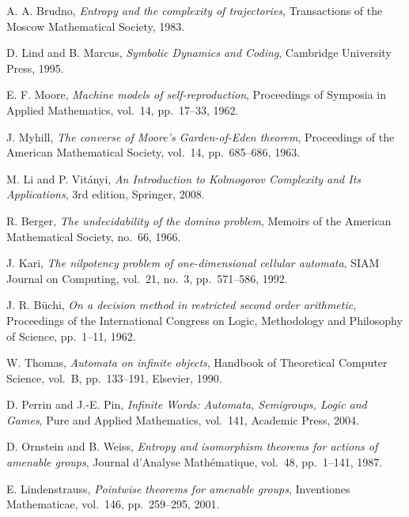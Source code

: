 \documentclass[11pt]{article}
\theoremstyle{definition}
\theoremstyle{remark}
\begin{document}
\begin{thebibliography}{99}

A. A. Brudno,
\textit{Entropy and the complexity of trajectories},
Transactions of the Moscow Mathematical Society, 1983.

D. Lind and B. Marcus,
\textit{Symbolic Dynamics and Coding},
Cambridge University Press, 1995.

E. F. Moore,
\textit{Machine models of self-reproduction},
Proceedings of Symposia in Applied Mathematics, vol.~14, pp.~17--33, 1962.

J. Myhill,
\textit{The converse of Moore's Garden-of-Eden theorem},
Proceedings of the American Mathematical Society, vol.~14, pp.~685--686, 1963.

M. Li and P. Vitányi,
\textit{An Introduction to Kolmogorov Complexity and Its Applications},
3rd edition, Springer, 2008.

R. Berger,
\textit{The undecidability of the domino problem},
Memoirs of the American Mathematical Society, no.~66, 1966.

J. Kari,
\textit{The nilpotency problem of one-dimensional cellular automata},
SIAM Journal on Computing, vol.~21, no.~3, pp.~571--586, 1992.

J. R. Büchi,
\textit{On a decision method in restricted second order arithmetic},
Proceedings of the International Congress on Logic, Methodology and Philosophy of Science, pp.~1--11, 1962.

W. Thomas,
\textit{Automata on infinite objects},
Handbook of Theoretical Computer Science, vol.~B, pp.~133--191, Elsevier, 1990.

D. Perrin and J.-E. Pin,
\textit{Infinite Words: Automata, Semigroups, Logic and Games},
Pure and Applied Mathematics, vol.~141, Academic Press, 2004.

D. Ornstein and B. Weiss,
\textit{Entropy and isomorphism theorems for actions of amenable groups},
Journal d'Analyse Mathématique, vol.~48, pp.~1--141, 1987.

E. Lindenstrauss,
\textit{Pointwise theorems for amenable groups},
Inventiones Mathematicae, vol.~146, pp.~259--295, 2001.

\end{thebibliography}
\end{document}
